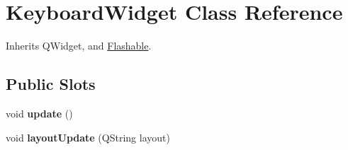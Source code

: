 \hypertarget{class_keyboard_widget}{\section{Keyboard\-Widget Class Reference}
\label{class_keyboard_widget}
}


Inherits Q\-Widget, and \hyperlink{class_flashable}{Flashable}.

\subsection*{Public Slots}
\begin{DoxyCompactItemize}
\item 
\hypertarget{class_keyboard_widget_a02510ce65636dca9c99604e55e605229}{void {\bfseries update} ()}\label{class_keyboard_widget_a02510ce65636dca9c99604e55e605229}

\item 
\hypertarget{class_keyboard_widget_a11dbb17db310484aea61e2f7ad289f2a}{void {\bfseries layout\-Update} (Q\-String layout)}\label{class_keyboard_widget_a11dbb17db310484aea61e2f7ad289f2a}

\end{DoxyCompactItemize}
